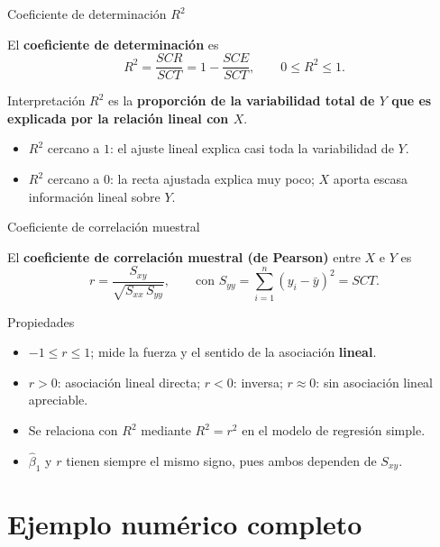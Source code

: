 \documentclass[aspectratio=169,11pt]{beamer}
\begin{document}
\begin{frame}{Coeficiente de determinación $R^2$}
\begin{definition}
El \textbf{coeficiente de determinación} es
\[
R^2 = \frac{SCR}{SCT} = 1 - \frac{SCE}{SCT}, \qquad 0 \le R^2 \le 1.
\]
\end{definition}

\begin{block}{Interpretación}
$R^2$ es la \textbf{proporción de la variabilidad total de $Y$ que es explicada por la relación lineal con $X$}.
\begin{itemize}
\item $R^2$ cercano a $1$: el ajuste lineal explica casi toda la variabilidad de $Y$.
\item $R^2$ cercano a $0$: la recta ajustada explica muy poco; $X$ aporta escasa información lineal sobre $Y$.
\end{itemize}
\end{block}
\end{frame}

\begin{frame}{Coeficiente de correlación muestral}
\begin{definition}
El \textbf{coeficiente de correlación muestral (de Pearson)} entre $X$ e $Y$ es
\[
r = \frac{S_{xy}}{\sqrt{S_{xx}\,S_{yy}}}, \qquad \text{con } S_{yy}=\sum_{i=1}^n (y_i-\bar y)^2 = SCT.
\]
\end{definition}

\begin{block}{Propiedades}
\begin{itemize}
\item $-1 \le r \le 1$; mide la fuerza y el sentido de la asociación \textbf{lineal}.
\item $r>0$: asociación lineal directa; $r<0$: inversa; $r\approx 0$: sin asociación lineal apreciable.
\item Se relaciona con $R^2$ mediante $R^2 = r^2$ en el modelo de regresión simple.
\item $\hat\beta_1$ y $r$ tienen siempre el mismo signo, pues ambos dependen de $S_{xy}$.
\end{itemize}
\end{block}
\end{frame}

\section{Ejemplo numérico completo}
\end{document}
